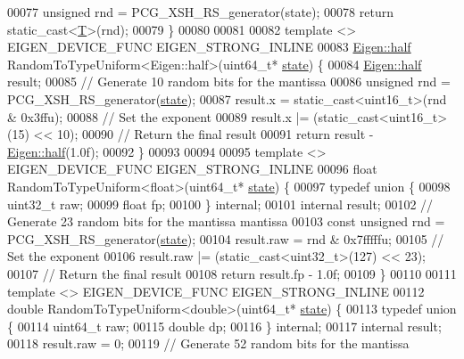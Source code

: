 \begin{DoxyCode}
00077   \textcolor{keywordtype}{unsigned} rnd = PCG\_XSH\_RS\_generator(state);
00078   \textcolor{keywordflow}{return} \textcolor{keyword}{static\_cast<}\hyperlink{group___sparse_core___module_class_eigen_1_1_triplet}{T}\textcolor{keyword}{>}(rnd);
00079 \}
00080 
00081 
00082 \textcolor{keyword}{template} <> EIGEN\_DEVICE\_FUNC EIGEN\_STRONG\_INLINE
00083 \hyperlink{struct_eigen_1_1half}{Eigen::half} RandomToTypeUniform<Eigen::half>(uint64\_t* \hyperlink{structstate}{state}) \{
00084   \hyperlink{struct_eigen_1_1half}{Eigen::half} result;
00085   \textcolor{comment}{// Generate 10 random bits for the mantissa}
00086   \textcolor{keywordtype}{unsigned} rnd = PCG\_XSH\_RS\_generator(\hyperlink{structstate}{state});
00087   result.x = \textcolor{keyword}{static\_cast<}uint16\_t\textcolor{keyword}{>}(rnd & 0x3ffu);
00088   \textcolor{comment}{// Set the exponent}
00089   result.x |= (\textcolor{keyword}{static\_cast<}uint16\_t\textcolor{keyword}{>}(15) << 10);
00090   \textcolor{comment}{// Return the final result}
00091   \textcolor{keywordflow}{return} result - \hyperlink{struct_eigen_1_1half}{Eigen::half}(1.0f);
00092 \}
00093 
00094 
00095 \textcolor{keyword}{template} <> EIGEN\_DEVICE\_FUNC EIGEN\_STRONG\_INLINE
00096 \textcolor{keywordtype}{float} RandomToTypeUniform<float>(uint64\_t* \hyperlink{structstate}{state}) \{
00097   \textcolor{keyword}{typedef} \textcolor{keyword}{union }\{
00098     uint32\_t raw;
00099     \textcolor{keywordtype}{float} fp;
00100   \} \textcolor{keyword}{internal};
00101   \textcolor{keyword}{internal} result;
00102   \textcolor{comment}{// Generate 23 random bits for the mantissa mantissa}
00103   \textcolor{keyword}{const} \textcolor{keywordtype}{unsigned} rnd = PCG\_XSH\_RS\_generator(\hyperlink{structstate}{state});
00104   result.raw = rnd & 0x7fffffu;
00105   \textcolor{comment}{// Set the exponent}
00106   result.raw |= (\textcolor{keyword}{static\_cast<}uint32\_t\textcolor{keyword}{>}(127) << 23);
00107   \textcolor{comment}{// Return the final result}
00108   \textcolor{keywordflow}{return} result.fp - 1.0f;
00109 \}
00110 
00111 \textcolor{keyword}{template} <> EIGEN\_DEVICE\_FUNC EIGEN\_STRONG\_INLINE
00112 \textcolor{keywordtype}{double} RandomToTypeUniform<double>(uint64\_t* \hyperlink{structstate}{state}) \{
00113   \textcolor{keyword}{typedef} \textcolor{keyword}{union }\{
00114     uint64\_t raw;
00115     \textcolor{keywordtype}{double} dp;
00116   \} \textcolor{keyword}{internal};
00117   \textcolor{keyword}{internal} result;
00118   result.raw = 0;
00119   \textcolor{comment}{// Generate 52 random bits for the mantissa}

\end{DoxyCode}
